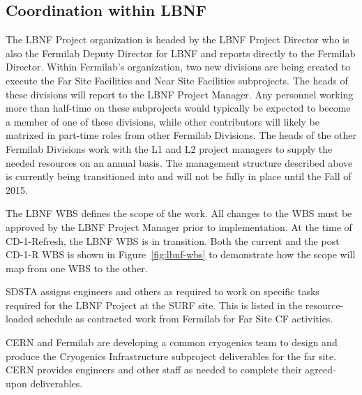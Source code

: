 \subsection{Coordination within LBNF}

The LBNF Project organization is headed by the LBNF Project Director who is also the Fermilab Deputy Director for LBNF and reports directly to the Fermilab Director. 
Within Fermilab’s organization, two new divisions are being created to execute the Far Site Facilities and Near Site Facilities subprojects. The heads of these divisions will report to the LBNF Project Manager. 
Any personnel working more than half-time on these subprojects would typically be expected to become a member of one of these divisions, while other contributors will likely be matrixed in part-time roles from other Fermilab Divisions.  The heads of the other Fermilab Divisions work with the L1 and L2 project managers to supply the needed resources on an annual basis.  The management structure described above is currently being transitioned into and will not be fully in place until the Fall of 2015.  

The LBNF WBS defines the scope of the work. All changes to the WBS must be approved by the LBNF Project Manager prior to implementation. At the time of CD-1-Refresh, the LBNF WBS is in transition. Both the current and the post CD-1-R WBS is shown in Figure~\ref{fig:lbnf-wbs} to demonstrate how the scope will map from one WBS to the other. 

SDSTA assigns engineers and others as required to work on specific tasks required for the LBNF Project at the SURF site. This is listed in the resource-loaded schedule as contracted work from Fermilab for Far Site CF activities. 

CERN and Fermilab are developing a common cryogenics team to design and produce the Cryogenics Infrastructure subproject deliverables for the far site. CERN provides engineers and other staff as needed to complete their agreed-upon deliverables.  


